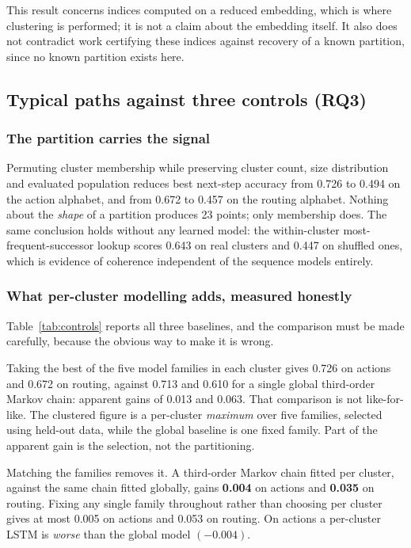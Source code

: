 

This result concerns indices computed on a reduced embedding, which is where clustering is
performed; it is not a claim about the embedding itself. It also does not contradict work
certifying these indices against recovery of a known partition, since no known partition exists
here.



\subsection{Typical paths against three controls (RQ3)}\label{sec:res-rq3}

\subsubsection{The partition carries the signal}

Permuting cluster membership while preserving cluster count, size distribution and evaluated
population reduces best next-step accuracy from 0.726 to 0.494 on the action alphabet, and from
0.672 to 0.457 on the routing alphabet. Nothing about the \emph{shape} of a partition produces
23 points; only membership does. The same conclusion holds without any learned model: the
within-cluster most-frequent-successor lookup scores 0.643 on real clusters and 0.447 on
shuffled ones, which is evidence of coherence independent of the sequence models entirely.

\subsubsection{What per-cluster modelling adds, measured honestly}

Table~\ref{tab:controls} reports all three baselines, and the comparison must be made carefully,
because the obvious way to make it is wrong.

Taking the best of the five model families in each cluster gives 0.726 on actions and 0.672 on
routing, against 0.713 and 0.610 for a single global third-order Markov chain: apparent gains of
0.013 and 0.063. That comparison is not like-for-like. The clustered figure is a per-cluster
\emph{maximum} over five families, selected using held-out data, while the global baseline is
one fixed family. Part of the apparent gain is the selection, not the partitioning.

Matching the families removes it. A third-order Markov chain fitted per cluster, against the
same chain fitted globally, gains \textbf{0.004} on actions and \textbf{0.035} on routing.
Fixing any single family throughout rather than choosing per cluster gives at most 0.005 on
actions and 0.053 on routing. On actions a per-cluster LSTM is \emph{worse} than the global
model \((-0.004)\).

